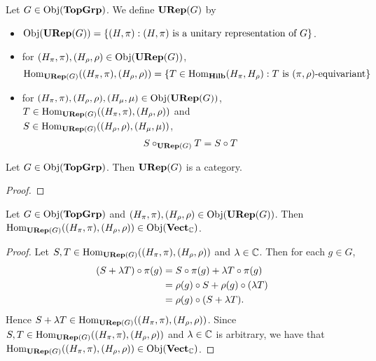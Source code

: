 \documentclass{book}
\begin{document}
	\begin{defn} 
		Let $G \in \Obj(\TopGrp)$. We define $\URep(G)$ by 
		\begin{itemize}
			\item $\Obj(\URep(G)) = \{(H, \pi): (H, \pi) \text{ is a unitary representation of $G$}\}$.
			\item for $(H_{\pi}, \pi),(H_{\rho}, \rho) \in \Obj(\URep(G))$, 
			$$\Hom_{\URep(G)}((H_{\pi}, \pi), (H_{\rho}, \rho)) = \{T \in \Hom_{\Hilb}(H_{\pi}, H_{\rho}): T \text{ is $(\pi, \rho)$-equivariant} \}$$
			\item for $(H_{\pi}, \pi), (H_{\rho}, \rho), (H_{\mu}, \mu) \in \Obj(\URep(G))$, $T \in \Hom_{\URep(G)}((H_{\pi}, \pi), (H_{\rho}, \rho))$ and \\
			$S \in  \Hom_{\URep(G)}((H_{\rho}, \rho), (H_{\mu}, \mu))$, 
			$$S \circ_{\URep(G)} T = S \circ T$$
		\end{itemize}
	\end{defn}
	
	\begin{ex}
		Let $G \in \Obj(\TopGrp)$. Then $\URep(G)$ is a category.
	\end{ex}
	
	\begin{proof}
	\end{proof}
	
	\begin{ex}
		Let $G \in \Obj(\TopGrp)$ and $(H_{\pi}, \pi), (H_{\rho}, \rho) \in \Obj(\URep(G))$. Then $\Hom_{\URep(G)}((H_{\pi}, \pi), (H_{\rho}, \rho)) \in \Obj(\VectC)$.
	\end{ex}
	
	\begin{proof}
		Let $S,T \in \Hom_{\URep(G)}((H_{\pi}, \pi), (H_{\rho}, \rho)) $ and $\lam \in \C$. Then for each $g \in G$,
		\begin{align*}
			(S + \lam T) \circ \pi(g) 
			& = S \circ \pi(g)  + \lam T \circ \pi(g) \\
			& = \rho(g) \circ S + \rho(g) \circ (\lam T) \\
			& = \rho(g) \circ (S + \lam T).
		\end{align*}
		Hence $S + \lam T \in \Hom_{\URep(G)}((H_{\pi}, \pi), (H_{\rho}, \rho)) $. Since $S, T \in \Hom_{\URep(G)}((H_{\pi}, \pi), (H_{\rho}, \rho)) $ and $\lam \in \C$ is arbitrary, we have that $\Hom_{\URep(G)}((H_{\pi}, \pi), (H_{\rho}, \rho)) \in \Obj(\VectC)$.
	\end{proof}
	
\end{document}
